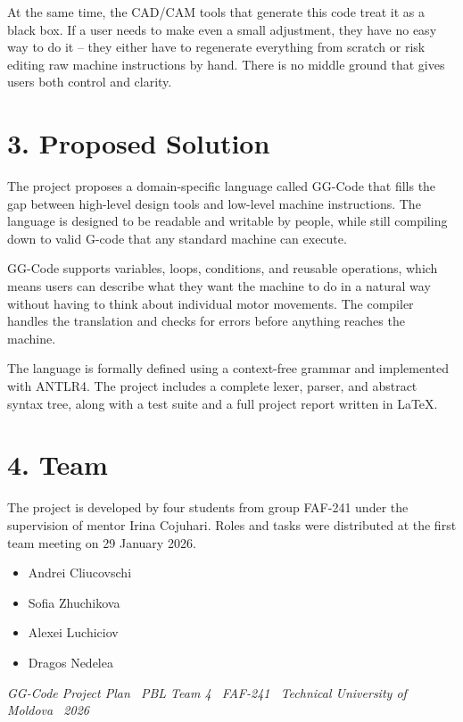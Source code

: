 \documentclass[12pt, a4paper]{article}
\begin{document}
At the same time, the CAD/CAM tools that generate this code treat it as a black box. If a user
needs to make even a small adjustment, they have no easy way to do it -- they either have to
regenerate everything from scratch or risk editing raw machine instructions by hand. There is
no middle ground that gives users both control and clarity.

\section{3. Proposed Solution}

The project proposes a domain-specific language called GG-Code that fills the gap between
high-level design tools and low-level machine instructions. The language is designed to be
readable and writable by people, while still compiling down to valid G-code that any standard
machine can execute.

GG-Code supports variables, loops, conditions, and reusable operations, which means users can
describe what they want the machine to do in a natural way without having to think about
individual motor movements. The compiler handles the translation and checks for errors before
anything reaches the machine.

The language is formally defined using a context-free grammar and implemented with ANTLR4.
The project includes a complete lexer, parser, and abstract syntax tree, along with a test
suite and a full project report written in \LaTeX.

\section{4. Team}

The project is developed by four students from group FAF-241 under the supervision of mentor
Irina Cojuhari. Roles and tasks were distributed at the first team meeting on 29 January 2026.

\begin{itemize}[leftmargin=2em, label={--}]
    \item Andrei Cliucovschi
    \item Sofia Zhuchikova
    \item Alexei Luchiciov
    \item Dragos Nedelea
\end{itemize}

\vspace{2em}
\begin{center}
    \small\textit{GG-Code Project Plan \textbar\ PBL Team 4 \textbar\ FAF-241 \textbar\ Technical University of Moldova \textbar\ 2026}
\end{center}
\end{document}
